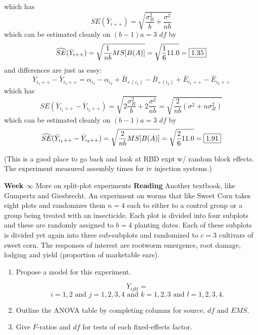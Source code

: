 which has 
$$ SE(\bar{Y}_{i++}) = \sqrt{\frac{\sigma_B^2}{b} + \frac{\sigma^2}{nb}}$$
which can be estimated cleanly on $(b-1)a=3$ $df$ by
$$ \widehat{SE}(\bar{Y}_{i++}) = \sqrt{\frac{1}{nb}MS[B(A)]} = \sqrt{\frac{1}{6}11.0} = \fbox{1.35}$$
and differences are just as easy:
$$ \bar{Y}_{i_1++} - \bar{Y}_{i_2++}= \alpha_{i_1} - \alpha_{i_2}+ \bar{B}_{+(i_1)} - \bar{B}_{+(i_2)} + \bar{E}_{i_1++} - \bar{E}_{i_2++}$$
which has 
$$ SE(\bar{Y}_{i_1++}-\bar{Y}_{i_2++}) = \sqrt{2\frac{\sigma_B^2}{b} + 2\frac{\sigma^2}{nb}} = \sqrt{\frac{2}{nb}(\sigma^2+n\sigma_B^2)}
$$
which can be estimated cleanly on $(b-1)a=3$ $df$ by
$$ \widehat{SE}(\bar{Y}_{i_1++}-\bar{Y}_{i_2++}) = \sqrt{\frac{2}{nb}MS[B(A)]} = \sqrt{\frac{2}{6}11.0} = \fbox{1.91}$$

\vspace{1in}

(This is a good place to go back and look at RBD expt w/ random 
block effects.  The experiment measured assembly times for iv injection
systems.)

















{\bf Week $\infty$} More on split-plot experiments
{\bf Reading } Another textbook, like Gumpertz and Giesbrecht.
\bigkn
\noindent
{}
An experiment on worms that like Sweet Corn takes eight plots and
randomizes them $n=4$ each to either to a control group or a
group being treated with an insecticide.  Each plot is divided
into four subplots and these are randomly assigned to $b=4$ 
planting dates.  Each of these subplots is divided yet again
into three sub-subplots and randomized to $c=3$ cultivars of
sweet corn.  The responses of interest are rootworm emergence, 
root damage, lodging and yield (proportion of marketable ears).


\begin{enumerate}
\item
Propose a model for this experiment.

$$ Y_{ijkl} = $$
$$ i=1,2 \mbox{ and } j=1,2,3,4 \mbox{ and } k=1,2,3 \mbox{ and } l=1,2,3,4.$$

\item
Outline the ANOVA table by completing columns for source, $df$ and $EMS$.

\item
Give $F$-ratios and $df$ for tests of each fixed-effects factor.
\end{enumerate} 
















